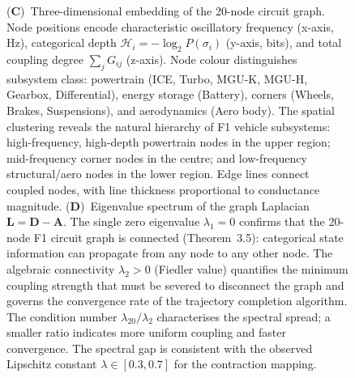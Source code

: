 \begin{figure}[!htbp]
{    (\textbf{C})~Three-dimensional embedding of the 20-node circuit graph. Node positions encode characteristic oscillatory frequency (x-axis, Hz), categorical depth $\mathcal{H}_i = -\log_2 P(\sigma_i)$ (y-axis, bits), and total coupling degree $\sum_j G_{ij}$ (z-axis). Node colour distinguishes subsystem class: powertrain (ICE, Turbo, MGU-K, MGU-H, Gearbox, Differential), energy storage (Battery), corners (Wheels, Brakes, Suspensions), and aerodynamics (Aero body). The spatial clustering reveals the natural hierarchy of F1 vehicle subsystems: high-frequency, high-depth powertrain nodes in the upper region; mid-frequency corner nodes in the centre; and low-frequency structural/aero nodes in the lower region. Edge lines connect coupled nodes, with line thickness proportional to conductance magnitude.
    (\textbf{D})~Eigenvalue spectrum of the graph Laplacian $\mathbf{L} = \mathbf{D} - \mathbf{A}$. The single zero eigenvalue $\lambda_1 = 0$ confirms that the 20-node F1 circuit graph is connected (Theorem~3.5): categorical state information can propagate from any node to any other node. The algebraic connectivity $\lambda_2 > 0$ (Fiedler value) quantifies the minimum coupling strength that must be severed to disconnect the graph and governs the convergence rate of the trajectory completion algorithm. The condition number $\lambda_{20}/\lambda_2$ characterises the spectral spread; a smaller ratio indicates more uniform coupling and faster convergence. The spectral gap is consistent with the observed Lipschitz constant $\lambda \in [0.3, 0.7]$ for the contraction mapping.}
    \label{fig:f1_circuit}
\end{figure}

